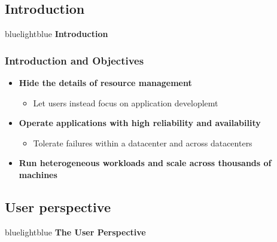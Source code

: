 \subsection{Introduction}
\begin{frame}
 \begin{colorblock}{blue}{lightblue}{ }
    \Large \textbf{Introduction}
  \end{colorblock}
\end{frame}

\begin{frame}
\frametitle{Introduction and Objectives}
\begin{itemize}
	\item {\bf Hide the details of resource management}
	\begin{itemize}
		\item Let users instead focus on application developlemt
	\end{itemize}

\vspace{20pt}

	\item {\bf Operate applications with high reliability and availability}
	\begin{itemize}
		\item Tolerate failures within a datacenter and across datacenters
	\end{itemize}

\vspace{20pt}

	\item {\bf Run heterogeneous workloads and scale across thousands of machines}
\end{itemize}
\end{frame}

\subsection{User perspective}
\begin{frame}
 \begin{colorblock}{blue}{lightblue}{ }
    \Large \textbf{The User Perspective}
  \end{colorblock}
\end{frame}

